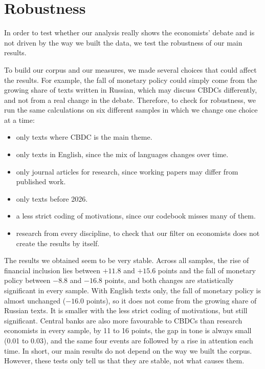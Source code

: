 \documentclass[11pt,a4paper]{article}
\begin{document}
\section{Robustness}\label{sec:robustness}

In order to test whether our analysis really shows the economists' debate and is not 
driven by the way we built the data, we test the robustness of our main results. 

To build our corpus and our measures, we made several choices that could affect the results. 
For example, the fall of monetary policy could simply come from the growing share of texts 
written in Russian, which may discuss CBDCs differently, and not from a real change in the debate. 
Therefore, to check for robustness, we run the same calculations on six different samples in which 
we change one choice at a time: 

\begin{itemize} 
\item only texts where CBDC is the main theme.
 \item only texts in English, since the mix of languages changes over time.
 \item only journal articles for research, since working papers may differ from published work.
\item only texts before 2026.
\item a less strict coding of motivations, since our codebook misses many of them.
\item research from every discipline, to check that our filter on economists does not create the results by itself. 
\end{itemize}



The results we obtained seem to be very stable. Across all samples, the rise of financial inclusion 
lies between $+11.8$ and $+15.6$ points and the fall of monetary policy between $-8.8$ and $-16.8$ points, 
and both changes are statistically significant in every sample. With English texts only, the fall of monetary 
policy is almost unchanged ($-16.0$ points), so it does not come from the growing share of Russian texts. It 
is smaller with the less strict coding of motivations, but still significant. Central banks are also more 
favourable to CBDCs than research economists in every sample, by 11 to 16 points, the gap in tone is always 
small (0.01 to 0.03), and the same four events are followed by a rise in attention each time. In short, our 
main results do not depend on the way we built the corpus. However, these tests only tell us that they are 
stable, not what causes them.
\end{document}
